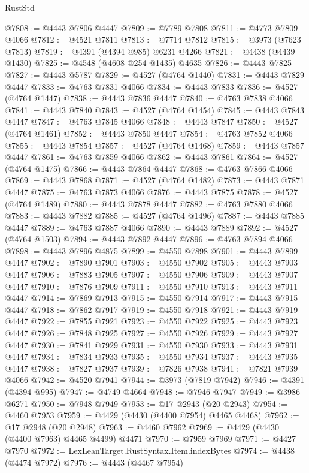 \begin{lexlean}{RustStd}
\begin{coremodule}
{\begin{coremodule}
{{{{{{{{{{{{{{{{{{{{{{{{{{{{{{{{{{{{{{{{{{{{{{{{{{{{{{{{{{{{{{{{{{{{@7808 := @4443 @7806 @4447
@7809 := @7789 @7808
@7811 := @4773 @7809 @4066
@7812 := @4521 @7811
@7813 := @7714 @7812
@7815 := @3973 (@7623 @7813)
@7819 := @4391 (@4394 @985) @6231 @4266
@7821 := @4438 (@4439 @1430)
@7825 := @4548 (@4608 @254 @1435) @4635
@7826 := @4443 @7825
@7827 := @4443 @5787
@7829 := @4527 (@4764 @1440)
@7831 := @4443 @7829 @4447
@7833 := @4763 @7831 @4066
@7834 := @4443 @7833
@7836 := @4527 (@4764 @1447)
@7838 := @4443 @7836 @4447
@7840 := @4763 @7838 @4066
@7841 := @4443 @7840
@7843 := @4527 (@4764 @1454)
@7845 := @4443 @7843 @4447
@7847 := @4763 @7845 @4066
@7848 := @4443 @7847
@7850 := @4527 (@4764 @1461)
@7852 := @4443 @7850 @4447
@7854 := @4763 @7852 @4066
@7855 := @4443 @7854
@7857 := @4527 (@4764 @1468)
@7859 := @4443 @7857 @4447
@7861 := @4763 @7859 @4066
@7862 := @4443 @7861
@7864 := @4527 (@4764 @1475)
@7866 := @4443 @7864 @4447
@7868 := @4763 @7866 @4066
@7869 := @4443 @7868
@7871 := @4527 (@4764 @1482)
@7873 := @4443 @7871 @4447
@7875 := @4763 @7873 @4066
@7876 := @4443 @7875
@7878 := @4527 (@4764 @1489)
@7880 := @4443 @7878 @4447
@7882 := @4763 @7880 @4066
@7883 := @4443 @7882
@7885 := @4527 (@4764 @1496)
@7887 := @4443 @7885 @4447
@7889 := @4763 @7887 @4066
@7890 := @4443 @7889
@7892 := @4527 (@4764 @1503)
@7894 := @4443 @7892 @4447
@7896 := @4763 @7894 @4066
@7898 := @4443 @7896 @4875
@7899 := @4550 @7898
@7901 := @4443 @7899 @4447
@7902 := @7890 @7901
@7903 := @4550 @7902
@7905 := @4443 @7903 @4447
@7906 := @7883 @7905
@7907 := @4550 @7906
@7909 := @4443 @7907 @4447
@7910 := @7876 @7909
@7911 := @4550 @7910
@7913 := @4443 @7911 @4447
@7914 := @7869 @7913
@7915 := @4550 @7914
@7917 := @4443 @7915 @4447
@7918 := @7862 @7917
@7919 := @4550 @7918
@7921 := @4443 @7919 @4447
@7922 := @7855 @7921
@7923 := @4550 @7922
@7925 := @4443 @7923 @4447
@7926 := @7848 @7925
@7927 := @4550 @7926
@7929 := @4443 @7927 @4447
@7930 := @7841 @7929
@7931 := @4550 @7930
@7933 := @4443 @7931 @4447
@7934 := @7834 @7933
@7935 := @4550 @7934
@7937 := @4443 @7935 @4447
@7938 := @7827 @7937
@7939 := @7826 @7938
@7941 := @7821 @7939 @4066
@7942 := @4520 @7941
@7944 := @3973 (@7819 @7942)
@7946 := @4391 (@4394 @995)
@7947 := @4749 @4664
@7948 := @7946 @7947
@7949 := @3986 @6271
@7950 := @7948 @7949
@7953 := @17 @2943 (@20 @2943)
@7954 := @4460 @7953
@7959 := @4429 (@4430 (@4400 @7954) @4465 @4468)
@7962 := @17 @2948 (@20 @2948)
@7963 := @4460 @7962
@7969 := @4429 (@4430 (@4400 @7963) @4465 @4499) @4471
@7970 := @7959 @7969
@7971 := @4427 @7970
@7972 := LexLeanTarget.RustSyntax.Item.indexBytes
@7974 := @4438 (@4474 @7972)
@7976 := @4443 (@4467 @7954)
}}}}}}}}}}}}}}}}}}}}}}}}}}}}}}}}}}}}}}}}}}}}}}}}}}}}}}}}}}}}}}}}}}}}
\end{coremodule}}
\end{coremodule}
\end{lexlean}

